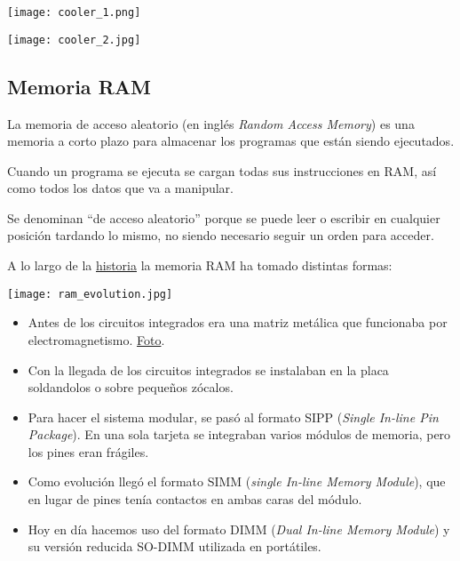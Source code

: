 {
\hfill
\begin{minipage}{0.3\linewidth}
    \texttt{[image: cooler\_1.png]}
\end{minipage}
\hfill
\begin{minipage}{0.5\linewidth}
    \texttt{[image: cooler\_2.jpg]}
\end{minipage}
\hfill
\vspace{30pt}
}



\begin{minipage}{0.6\linewidth}

\subsection{Memoria RAM}
\setlength{\parskip}{1.2em}
La memoria de acceso aleatorio (en inglés \textit{Random Access Memory}) es una memoria a corto plazo para almacenar los programas que están siendo ejecutados.

Cuando un programa se ejecuta se cargan todas sus instrucciones en RAM, así como todos los datos que va a manipular.

Se denominan “de acceso aleatorio” porque se puede leer o escribir en cualquier posición tardando lo mismo, no siendo necesario seguir un orden para acceder.

A lo largo de la \href{https://es.wikipedia.org/wiki/Memoria_de_acceso_aleatorio\#M%C3%B3dulos_de_RAM}{historia} la memoria RAM ha tomado distintas formas:
\end{minipage}
\hfill
\begin{minipage}{0.35\linewidth}
    \texttt{[image: ram\_evolution.jpg]}
    \vspace{-30pt}
\end{minipage}

\begin{itemize}
    \item Antes de los circuitos integrados era una matriz metálica que funcionaba por electromagnetismo. \href{https://es.wikipedia.org/wiki/Memoria_de_acceso_aleatorio#/media/Archivo:Electronic_Memory.jpg}{Foto}.
    \item Con la llegada de los circuitos integrados se instalaban en la placa soldandolos o sobre pequeños zócalos.
    \item Para hacer el sistema modular, se pasó al formato SIPP (\textit{Single In-line Pin Package}). En una sola tarjeta se integraban varios módulos de memoria, pero los pines eran frágiles.
    \item Como evolución llegó el formato SIMM (\textit{single In-line Memory Module}), que en lugar de pines tenía contactos en ambas caras del módulo.
    \item Hoy en día hacemos uso del formato DIMM (\textit{Dual In-line Memory Module}) y su versión reducida SO-DIMM utilizada en portátiles.
\end{itemize}

